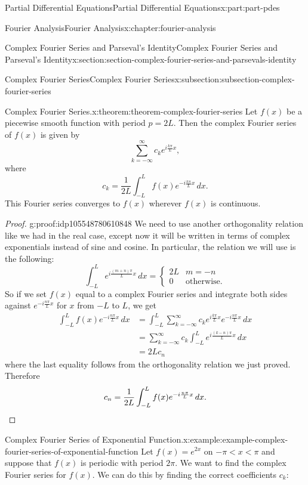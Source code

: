 \documentclass[oneside,10pt,]{book}
\numberwithin{equation}{part}
\newcommand{\qedhere}{\relax}
\newcommand{\amp}{&}
\begin{document}
\begin{partptx}{Partial Differential Equations}{}{Partial Differential Equations}{}{}{x:part:part-pdes}
\begin{chapterptx}{Fourier Analysis}{}{Fourier Analysis}{}{}{x:chapter:fourier-analysis}
\begin{sectionptx}{Complex Fourier Series and Parseval's Identity}{}{Complex Fourier Series and Parseval's Identity}{}{}{x:section:section-complex-fourier-series-and-parsevals-identity}
\begin{subsectionptx}{Complex Fourier Series}{}{Complex Fourier Series}{}{}{x:subsection:subsection-complex-fourier-series}
\begin{theorem}{Complex Fourier Series.}{}{x:theorem:theorem-complex-fourier-series}
%
Let \(f(x)\) be a piecewise smooth function with period \(p=2L\). Then the complex Fourier series of \(f(x)\) is given by%
\begin{equation*}
\sum_{k=-\infty}^{\infty}c_{k}e^{i\frac{k\pi}{L}x},
\end{equation*}
where%
\begin{equation*}
c_{k} = \frac{1}{2L}\int_{-L}^{L}f(x)e^{-i\frac{k\pi}{L}x}\,dx.
\end{equation*}
This Fourier series converges to \(f(x)\) wherever \(f(x)\) is continuous.%
\end{theorem}
\begin{proof}{}{g:proof:idp105548780610848}
We need to use another orthogonality relation like we had in the real case, except now it will be written in terms of complex exponentials instead of sine and cosine. In particular, the relation we will use is the following:%
\begin{equation*}
\int_{-L}^{L}e^{i\frac{(m+n)\pi}{L}x}\,dx = \begin{cases} 2L \amp m=-n \\ 0 \amp \text{otherwise.}\end{cases}
\end{equation*}
So if we set \(f(x)\) equal to a complex Fourier series and integrate both sides against \(e^{-i\frac{n\pi}{L}x}\) for \(x\) from \(-L\) to \(L\), we get%
\begin{align*}
\int_{-L}^{L}f(x)e^{-i\frac{n\pi}{L}x}\,dx \amp = \int_{-L}^{L}\sum_{k=-\infty}^{\infty}c_{k}e^{i\frac{k\pi}{L}x}e^{-i\frac{n\pi}{L}x}\,dx \\
\amp= \sum_{k=-\infty}^{\infty}c_{k}\int_{-L}^{L}e^{i\frac{(k-n)\pi}{L}x}\,dx\\
\amp= 2Lc_{n}
\end{align*}
where the last equality follows from the orthogonality relation we just proved. Therefore%
\begin{equation*}
c_{n} = \frac{1}{2L}\int_{-L}^{L}f(x)e^{-i\frac{n\pi}{L}x}\,dx.\qedhere
\end{equation*}
%
\end{proof}
\begin{example}{Complex Fourier Series of Exponential Function.}{x:example:example-complex-fourier-series-of-exponential-function}%
Let \(f(x) = e^{2x}\) on \(-\pi<x<\pi\) and suppose that \(f(x)\) is periodic with period \(2\pi\). We want to find the complex Fourier series for \(f(x)\). We can do this by finding the correct coefficients \(c_{k}\):%
\begin{align*}

\end{align*}
\end{example}
\end{subsectionptx}
\end{sectionptx}
\end{chapterptx}
\end{partptx}
\end{document}
